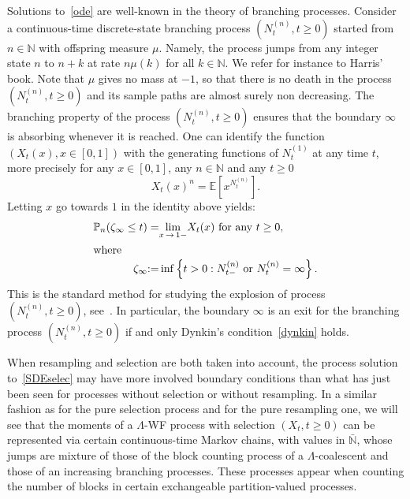 \documentclass[10pt]{amsart}
\theoremstyle{definition}\newtheorem{defi}[theo]{Definition}\newtheorem{rema}[theo]{Remark}\newtheorem{exam}[theo]{Example}\newtheorem{exem}[theo]{Example}\newtheorem{nota}[theo]{Notation}
\newcommand{\bbN}{\mathbb{N}}
\newcommand{\bbE}{\mathbb{E}}
\newcommand{\bbP}{\mathbb{P}}
\begin{document}
Solutions to~\eqref{ode} are well-known in the theory of branching processes. Consider a continuous-time discrete-state branching process $(N_t^{(n)},t\geq 0)$ started from\linebreak $n\in \bbN$ with offspring measure $\mu$. Namely, the process jumps from any integer state $n$ to $n+k$ at rate $n\mu(k)$ for all $k\in \bbN$. We refer for instance to Harris' book\linebreak\cite[Chapter~V]{Harris}. Note that $\mu$ gives no mass at $-1$, so that there is no death in the process $(N_t^{(n)},t\geq 0)$ and its sample paths are almost surely non decreasing. The branching property of the process $(N_t^{(n)},t\geq 0)$ ensures that the boundary $\infty$ is absorbing whenever it is reached. One can identify the function $(X_t(x),x \in [0,1])$ with the generating functions of $N^{(1)}_t$ at any time $t$, more precisely for any $x\in [0,1]$, any $n\in \bbN$ and any $t\geq 0$
\begin{equation}\label{dualbranching}
X_t(x)^{n}=\bbE\left[x^{N_t^{(n)}}\right].
\end{equation}
Letting $x$ go towards $1$ in the identity above yields: 
\begin{align*}
\bbP_n(\zeta_\infty\leq t)=& \underset{x\,\rightarrow \,1-}{\lim} X_t(x) \text{ for any }t\geq 0,\\
\intertext{where}
\zeta_\infty{:=}& \inf\left\{t>0: N_{t-}^{(n)} \text{ or } N_t^{(n)}=\infty\right\}.
\end{align*}
This is the standard method for studying the explosion of process $(N_t^{(n)},t\geq 0)$, see~\cite[Chapter~V, Theorem~9.1]{Harris}. In particular, the boundary $\infty$ is an exit for the branching process $(N_t^{(n)},t\geq 0)$ if and only Dynkin's condition~\eqref{dynkin} holds.

When resampling and selection are both taken into account, the process solution to~\eqref{SDEselec} may have more involved boundary conditions than what has just been seen for processes without selection or without resampling. In a similar fashion as for the pure selection process and for the pure resampling one, we will see that the moments of a $\Lambda$-WF process with selection $(X_t,t\geq 0)$ can be represented via certain continuous-time Markov chains, with values in $\bar{\bbN}$, whose jumps are mixture of those of the block counting process of a $\Lambda$-coalescent and those of an increasing branching processes. These processes appear when counting the number of blocks in certain exchangeable partition-valued processes.
\end{document}

